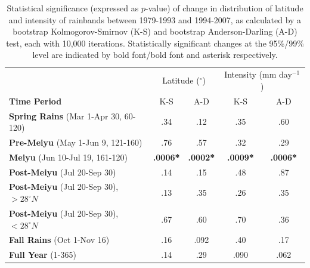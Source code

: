 \documentclass{ametsoc}
\begin{document}
\begin{table}[p]

\centering

\caption{Statistical significance (expressed as $p$-value) of change in distribution of latitude and intensity of rainbands between 1979-1993 and 1994-2007, as calculated by a bootstrap Kolmogorov-Smirnov (K-S) and bootstrap Anderson-Darling (A-D) test, each with 10,000 iterations. Statistically significant changes at the 95\%/99\% level are indicated by bold font/bold font and asterisk respectively.}

\begin{tabular}{ l c c c c}
												& \multicolumn{2}{c}{Latitude ($^\circ$)} & \multicolumn{2}{c}{Intensity (mm day$^{-1}$)} \\
	 \textbf{Time Period} 							& K-S 			& A-D 			& K-S 			& A-D \\
	 \hline
	\textbf{Spring Rains} (Mar 1-Apr 30, 60-120)  		& .34			& .12			& .35			& .60 \\
	\textbf{Pre-Meiyu} (May 1-Jun 9, 121-160)  		& .76			&  .57 			& .32			& .29 \\
	\textbf{Meiyu} (Jun 10-Jul 19, 161-120)			& \textbf{.0006*}	&  \textbf{.0002*}	&  \textbf{.0009*}	& \textbf{.0006*} \\	
	\textbf{Post-Meiyu} (Jul 20-Sep 30) 				& .14			&  .15 			&  .48			& .87 \\
	\textbf{Post-Meiyu} (Jul 20-Sep 30), $>28^{\circ}N$   & .13			&  .35 			&  .26 			& .35 \\	
	\textbf{Post-Meiyu} (Jul 20-Sep 30), $<28^{\circ}N$   & .67			&  .60			&  .70			& .36 \\	
	\textbf{Fall Rains} (Oct 1-Nov 16) 					& .16	 		&  .092			&  .40 			& .17 \\	
	\textbf{Full Year} (1-365)						& .14			&  .29			&  .090	 		& .062 \\	
	
\end{tabular}
\label{tab:t314}
\end{table}

%
\end{document}
